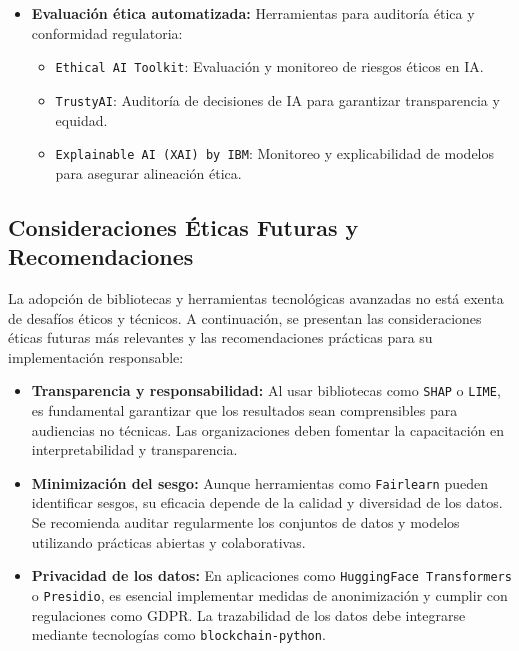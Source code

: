 \begin{refsection}
\begin{itemize}
    \item \textbf{Evaluación ética automatizada:}  
    Herramientas para auditoría ética y conformidad regulatoria:
    \begin{itemize}
        \item \texttt{Ethical AI Toolkit}: Evaluación y monitoreo de riesgos éticos en IA.
        \item \texttt{TrustyAI}: Auditoría de decisiones de IA para garantizar transparencia y equidad.
        \item \texttt{Explainable AI (XAI) by IBM}: Monitoreo y explicabilidad de modelos para asegurar alineación ética.
    \end{itemize}
\end{itemize}



\subsection{Consideraciones Éticas Futuras y Recomendaciones}

La adopción de bibliotecas y herramientas tecnológicas avanzadas no está exenta de desafíos éticos y técnicos. A continuación, se presentan las consideraciones éticas futuras más relevantes y las recomendaciones prácticas para su implementación responsable:

\begin{itemize}
    \item \textbf{Transparencia y responsabilidad:}  
    Al usar bibliotecas como \texttt{SHAP} o \texttt{LIME}, es fundamental garantizar que los resultados sean comprensibles para audiencias no técnicas. Las organizaciones deben fomentar la capacitación en interpretabilidad y transparencia.

    \item \textbf{Minimización del sesgo:}  
    Aunque herramientas como \texttt{Fairlearn} pueden identificar sesgos, su eficacia depende de la calidad y diversidad de los datos. Se recomienda auditar regularmente los conjuntos de datos y modelos utilizando prácticas abiertas y colaborativas.

    \item \textbf{Privacidad de los datos:}  
    En aplicaciones como \texttt{HuggingFace Transformers} o \texttt{Presidio}, es esencial implementar medidas de anonimización y cumplir con regulaciones como GDPR. La trazabilidad de los datos debe integrarse mediante tecnologías como \texttt{blockchain-python}.


\end{itemize}
\end{refsection}
